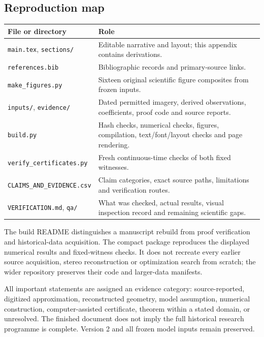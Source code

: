 \subsection*{Reproduction map}
\begin{tabularx}{\textwidth}{@{}>{\raggedright\arraybackslash}p{}>{\raggedright\arraybackslash}X@{}}\toprule
File or directory & Role\\\midrule
\texttt{main.tex}, \texttt{sections/} & Editable narrative and layout; this appendix contains derivations.\\
\texttt{references.bib} & Bibliographic records and primary-source links.\\
\texttt{make\_figures.py} & Sixteen original scientific figure composites from frozen inputs.\\
\texttt{inputs/}, \texttt{evidence/} & Dated permitted imagery, derived observations, coefficients, proof code and source reports.\\
\texttt{build.py} & Hash checks, numerical checks, figures, compilation, text/font/layout checks and page rendering.\\
\texttt{verify\_\allowbreak certificates.py} & Fresh continuous-time checks of both fixed witnesses.\\
\texttt{CLAIMS\_\allowbreak AND\_\allowbreak EVIDENCE.csv} & Claim categories, exact source paths, limitations and verification routes.\\
\texttt{VERIFICATION.md}, \texttt{qa/} & What was checked, actual results, visual inspection record and remaining scientific gaps.\\\bottomrule
\end{tabularx}
\medskip

The build README distinguishes a manuscript rebuild from proof verification and historical-data acquisition. The compact package reproduces the displayed numerical results and fixed-witness checks. It does not recreate every earlier source acquisition, stereo reconstruction or optimization search from scratch; the wider repository preserves their code and larger-data manifests.

All important statements are assigned an evidence category: source-reported, digitized approximation, reconstructed geometry, model assumption, numerical construction, computer-assisted certificate, theorem within a stated domain, or unresolved. The finished document does not imply the full historical research programme is complete. Version 2 and all frozen model inputs remain preserved.
